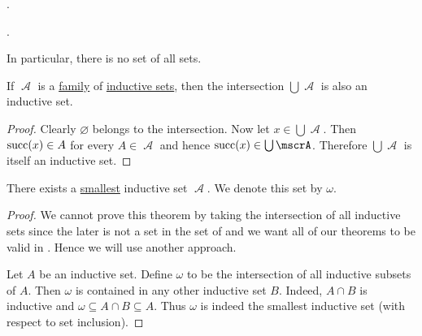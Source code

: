 \begin{proposition}\label{thm:zfc_existence_theorems}
  .
\end{proposition}

\begin{proposition}\label{thm:zfc_no_set_is_member_of_itself}
  .

  In particular, there is no set of all sets.
\end{proposition}

\begin{proposition}\label{thm:intersection_of_inductive_sets}
  If \( \mscrA \) is a \hyperref[rem:family_of_sets]{family} of \hyperref[def:inductive_set]{inductive sets}, then the intersection \( \bigcup \mscrA \) is also an inductive set.
\end{proposition}
\begin{proof}
  Clearly \( \varnothing \) belongs to the intersection. Now let \( x \in \bigcup \mscrA \). Then \( \operatorname{succ}(x) \in A \) for every \( A \in \mscrA \) and hence \( \op{succ}(x) \in \bigcup \mscrA \). Therefore \( \bigcup \mscrA \) is itself an inductive set.
\end{proof}

\begin{proposition}\label{thm:smallest_inductive_set_existence}
  There exists a \hyperref[def:poset_extremal_points/maximum_and_minimum]{smallest} inductive set \( \mscrA \). We denote this set by \( \omega \).
\end{proposition}
\begin{proof}
  We cannot prove this theorem by taking the intersection of all inductive sets since the later is not a set in the set of  and we want all of our theorems to be valid in . Hence we will use another approach.

  Let \( A \) be an inductive set. Define \( \omega \) to be the intersection of all inductive subsets of \( A \). Then \( \omega \) is contained in any other inductive set \( B \). Indeed, \( A \cap B \) is inductive and \( \omega \subseteq A \cap B \subseteq A \). Thus \( \omega \) is indeed the smallest inductive set (with respect to set inclusion).
\end{proof}

